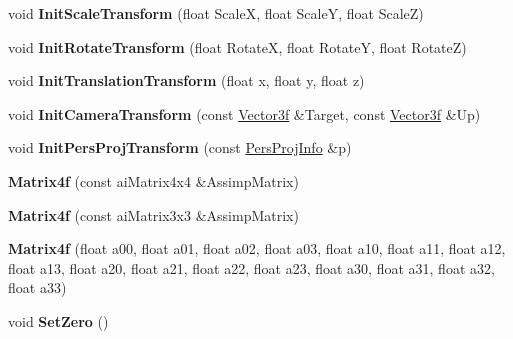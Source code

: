 \begin{DoxyCompactItemize}
\item 
\hypertarget{classMatrix4f_aa0552eaded648aa9c77ef72385e79ced}{void {\bfseries Init\-Scale\-Transform} (float Scale\-X, float Scale\-Y, float Scale\-Z)}\label{classMatrix4f_aa0552eaded648aa9c77ef72385e79ced}

\item 
\hypertarget{classMatrix4f_acaba507cb1366b75f353816c8f7c1f81}{void {\bfseries Init\-Rotate\-Transform} (float Rotate\-X, float Rotate\-Y, float Rotate\-Z)}\label{classMatrix4f_acaba507cb1366b75f353816c8f7c1f81}

\item 
\hypertarget{classMatrix4f_aebf4d72c978e7c2c5770da4b2f9b88bb}{void {\bfseries Init\-Translation\-Transform} (float x, float y, float z)}\label{classMatrix4f_aebf4d72c978e7c2c5770da4b2f9b88bb}

\item 
\hypertarget{classMatrix4f_a6e8c636a04e1fc8d81f448cd68a13aea}{void {\bfseries Init\-Camera\-Transform} (const \hyperlink{structVector3f}{Vector3f} \&Target, const \hyperlink{structVector3f}{Vector3f} \&Up)}\label{classMatrix4f_a6e8c636a04e1fc8d81f448cd68a13aea}

\item 
\hypertarget{classMatrix4f_a48064d7cf650e26623cf5371e2ef1b8b}{void {\bfseries Init\-Pers\-Proj\-Transform} (const \hyperlink{structPersProjInfo}{Pers\-Proj\-Info} \&p)}\label{classMatrix4f_a48064d7cf650e26623cf5371e2ef1b8b}

\item 
\hypertarget{classMatrix4f_adecdcb191c856fb8e265a9496e9e1ad2}{{\bfseries Matrix4f} (const ai\-Matrix4x4 \&Assimp\-Matrix)}\label{classMatrix4f_adecdcb191c856fb8e265a9496e9e1ad2}

\item 
\hypertarget{classMatrix4f_a30bb126218b822b00e3365e2a9a55e42}{{\bfseries Matrix4f} (const ai\-Matrix3x3 \&Assimp\-Matrix)}\label{classMatrix4f_a30bb126218b822b00e3365e2a9a55e42}

\item 
\hypertarget{classMatrix4f_a46a6fc0c402055b8832818d66f61bc14}{{\bfseries Matrix4f} (float a00, float a01, float a02, float a03, float a10, float a11, float a12, float a13, float a20, float a21, float a22, float a23, float a30, float a31, float a32, float a33)}\label{classMatrix4f_a46a6fc0c402055b8832818d66f61bc14}

\item 
\hypertarget{classMatrix4f_a7df3ebb63a5ed13b15a31d2e6b507a7e}{void {\bfseries Set\-Zero} ()}\label{classMatrix4f_a7df3ebb63a5ed13b15a31d2e6b507a7e}


\end{DoxyCompactItemize}
